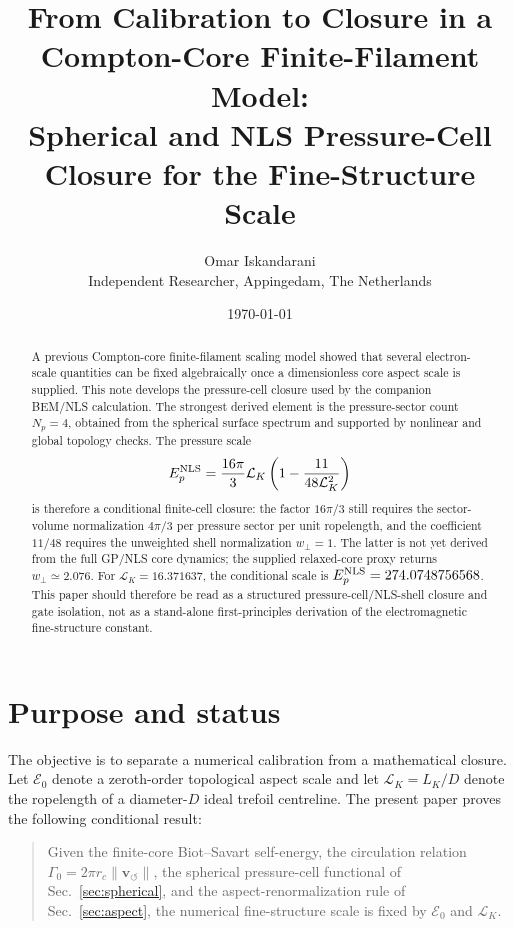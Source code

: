 \documentclass[11pt]{article}
\title{From Calibration to Closure in a Compton-Core Finite-Filament Model:\\
Spherical and NLS Pressure-Cell Closure for the Fine-Structure Scale}
\author{Omar Iskandarani\\
\small Independent Researcher, Appingedam, The Netherlands}
\date{\today}
\newcommand{\vnorm}{\lVert\mathbf{v}_{\!\boldsymbol{\circlearrowleft}}\rVert}
\newcommand{\rc}{r_c}
\newcommand{\LK}{\mathcal L_K}
\newcommand{\Ezero}{\mathcal E_0}
\begin{document}
\maketitle

\begin{abstract}
A previous Compton-core finite-filament scaling model showed that several
electron-scale quantities can be fixed algebraically once a dimensionless core
aspect scale is supplied.  This note develops the pressure-cell closure used by
the companion BEM/NLS calculation.  The strongest derived element is the
pressure-sector count \(N_p=4\), obtained from the spherical surface spectrum
and supported by nonlinear and global topology checks.  The pressure scale
\[
  E_p^{\rm NLS}
  =
  \frac{16\pi}{3}\mathcal L_K
  \left(1-\frac{11}{48\mathcal L_K^2}\right)
\]
is therefore a conditional finite-cell closure: the factor \(16\pi/3\) still
requires the sector-volume normalization \(4\pi/3\) per pressure sector per unit
ropelength, and the coefficient \(11/48\) requires the unweighted shell
normalization \(w_\perp=1\).  The latter is not yet derived from the full GP/NLS
core dynamics; the supplied relaxed-core proxy returns \(w_\perp\simeq2.076\).
For \(\mathcal L_K=16.371637\), the conditional scale is
\(E_p^{\rm NLS}=274.0748756568\).  This paper should therefore be read as a
structured pressure-cell/NLS-shell closure and gate isolation, not as a
stand-alone first-principles derivation of the electromagnetic fine-structure
constant.
\end{abstract}

\section{Purpose and status}

The objective is to separate a numerical calibration from a mathematical closure.  Let
\(\Ezero\) denote a zeroth-order topological aspect scale and let \(\LK=L_K/D\) denote the
ropelength of a diameter-\(D\) ideal trefoil centreline.  The present paper proves the following
conditional result:

\begin{quote}
Given the finite-core Biot--Savart self-energy, the circulation relation
\(\Gamma_0=2\pi \rc\vnorm\), the spherical pressure-cell functional of
Sec.~\ref{sec:spherical}, and the aspect-renormalization rule of Sec.~\ref{sec:aspect},
the numerical fine-structure scale is fixed by \(\Ezero\) and \(\LK\).
\end{quote}
\end{document}
